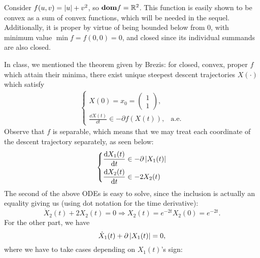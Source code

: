 \documentclass[10pt]{article}
\begin{document}
\allowdisplaybreaks
\everymath{\displaystyle}


\begin{Exercise}
	\label{ex:p1}
	Consider $f(u, v) = \left| u \right| + v^2$, so $\textbf{dom} f = \mathbb{R}^2$. This function is
    easily shown to be convex as a sum of convex functions, which will be
    needed in the sequel. Additionally, it is proper by virtue of being bounded
    below from $0$, with minimum value $\min f = f(0, 0) = 0$, and closed since
    its individual summands are also closed.

    \ExePart
        In class, we mentioned the theorem given by Brezis: for closed, convex,
        proper $f$ which attain their minima, there exist unique steepest
        descent trajectories $X(\cdot)$ which satisfy
        \begin{align}
            \begin{cases}
                X(0) = x_0 = \begin{pmatrix} 1 \\ 1 \end{pmatrix}, & \\
                \frac{\dd{} X(t)}{\dd t} \in -\partial f(X(t)), & \text{a.e.}
            \end{cases}
            \label{eq:descent_trajectory}
        \end{align}
        Observe that $f$ is separable, which means that we may treat each
        coordinate of the descent trajectory separately, as seen below:
        \begin{align*}
            \left\{
            \begin{aligned}
                \frac{\mathrm{d}{} X_1(t)}{\mathrm{d}{t}} & \in
                -\partial \left| X_1(t) \right| \\
                \frac{\mathrm{d}{} X_2(t)}{\mathrm{d}{t}} & \in
                -2 X_2(t)
            \end{aligned} \right.
        \end{align*}
        The second of the above ODEs is easy to solve, since the inclusion is
        actually an equality giving us (using dot notation for the time
        derivative):
        \[
            \dot{X}_2(t) + 2 X_2(t) = 0 \Rightarrow
            X_2(t) = e^{-2t} X_2(0) = e^{-2t}.
        \]
        For the other part, we have
        \[
            \dot{X}_1(t) + \partial \left| X_1(t) \right| = 0,
        \]
        where we have to take cases depending on $X_1(t)$'s sign:
        \begin{itemize}

\end{itemize}
\end{Exercise}
\end{document}
